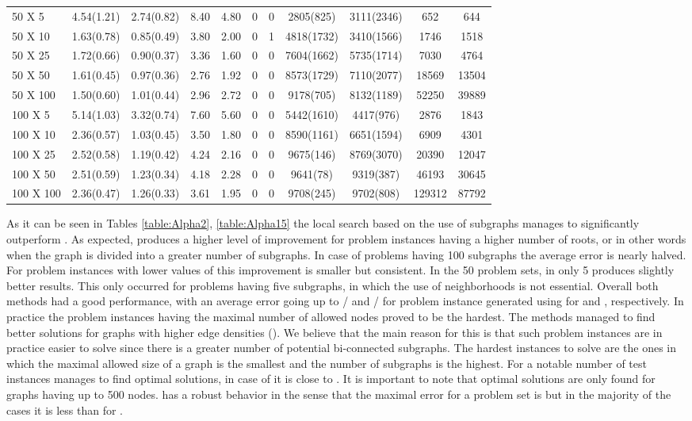 \begin{table*}[htb]
\begin{tabularx}{430pt}{X*{10}{c}}
\midrule
50 X 5 & 4.54(1.21) & 2.74(0.82) & 8.40 & 4.80 & 0 & 0 & 2805(825) & 3111(2346) & 652 & 644 \\
50 X 10 & 1.63(0.78) & 0.85(0.49) & 3.80 & 2.00 & 0 & 1 & 4818(1732) & 3410(1566) & 1746 & 1518 \\
50 X 25 & 1.72(0.66) & 0.90(0.37) & 3.36 & 1.60 & 0 & 0 & 7604(1662) & 5735(1714) & 7030 & 4764 \\
50 X 50 & 1.61(0.45) & 0.97(0.36) & 2.76 & 1.92 & 0 & 0 & 8573(1729) & 7110(2077) & 18569 & 13504 \\
50 X 100 & 1.50(0.60) & 1.01(0.44) & 2.96 & 2.72 & 0 & 0 & 9178(705) & 8132(1189) & 52250 & 39889 \\
\midrule
100 X 5 & 5.14(1.03) & 3.32(0.74) & 7.60 & 5.60 & 0 & 0 & 5442(1610) & 4417(976) & 2876 & 1843 \\
100 X 10 & 2.36(0.57) & 1.03(0.45) & 3.50 & 1.80 & 0 & 0 & 8590(1161) & 6651(1594) & 6909 & 4301 \\
100 X 25 & 2.52(0.58) & 1.19(0.42) & 4.24 & 2.16 & 0 & 0 & 9675(146) & 8769(3070) & 20390 & 12047 \\
100 X 50 & 2.51(0.59) & 1.23(0.34) & 4.18 & 2.28 & 0 & 0 & 9641(78) & 9319(387) & 46193 & 30645 \\
100 X 100 & 2.36(0.47) & 1.26(0.33) & 3.61 & 1.95 & 0 & 0 & 9708(245) & 9702(808) & 129312 & 87792 \\
\bottomrule
\end{tabularx}
\end{table*}

As it can be seen in Tables \ref{table:Alpha2}, \ref{table:Alpha15} the local search based on the use of subgraphs  manages to significantly outperform . As expected,  produces a higher level of improvement for problem instances having a higher number of roots, or in other words when the  graph is divided into a greater number of subgraphs. In case of problems having 100 subgraphs the  average error is nearly halved. For problem instances with lower values of  this improvement is smaller but consistent. In the 50 problem sets, in only 5  produces slightly better results. This only occurred for problems having five subgraphs, in which the use of neighborhoods is not essential. Overall both methods had a good performance, with an average error going up to / and / for problem instance generated using  for  and , respectively. In practice the problem instances having the maximal number of allowed nodes  proved to be the hardest. The methods managed to find better solutions for  graphs with higher edge densities (). We believe that the main reason for this is that such problem instances are in practice easier to solve since there is a greater number of potential bi-connected subgraphs.  The hardest instances to solve are the ones in which the maximal allowed size of a graph is the smallest and the number of subgraphs is the highest. For a notable number of test instances  manages to find optimal solutions, in case of  it is close to . It is important to note that optimal solutions are only found for graphs having up to 500 nodes.  has a robust behavior in the sense that the maximal error for a problem set  is  but in the majority of the cases it is less than  for .

